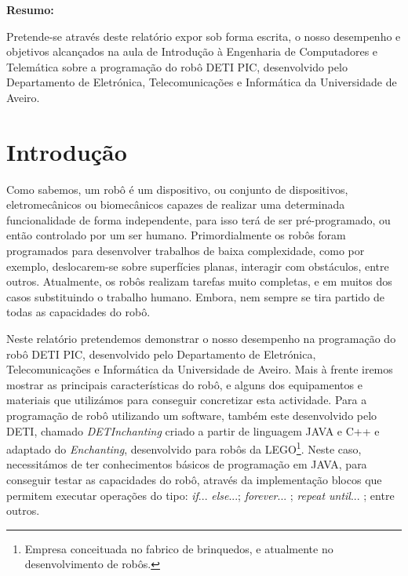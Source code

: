 \documentclass[a4paper, 12pt, onecolumn, oneside]{report}
\begin{document}
\vspace*{\fill}



\textbf{Resumo:}


\begin{flushleft}

 Pretende-se através deste relatório expor sob forma escrita, o nosso desempenho e objetivos alcançados na aula de Introdução à Engenharia de Computadores e Telemática sobre a programação do robô DETI PIC, desenvolvido pelo Departamento de Eletrónica, Telecomunicações e Informática da Universidade de Aveiro.

\end{flushleft}


\vspace*{\fill}

\newpage




\newpage

\renewcommand*\contentsname{Índice}

\tableofcontents 


\newpage
 
\section{Introdução} 


Como sabemos, um robô é um dispositivo, ou conjunto de dispositivos, eletromecânicos ou biomecânicos capazes de realizar uma determinada funcionalidade de forma independente, para isso terá de ser pré-programado, ou então controlado por um ser humano. Primordialmente os robôs foram programados para desenvolver trabalhos de baixa complexidade, como por exemplo, deslocarem-se sobre superfícies planas, interagir com obstáculos, entre outros. Atualmente, os robôs realizam tarefas muito completas, e em muitos dos casos substituindo o trabalho humano. Embora, nem sempre se tira partido de todas as capacidades do robô.

Neste relatório pretendemos demonstrar o nosso desempenho na programação do robô DETI PIC, desenvolvido pelo Departamento de Eletrónica, Telecomunicações e Informática da Universidade de Aveiro. Mais à frente iremos mostrar as principais características do robô, e alguns dos equipamentos e materiais que utilizámos para conseguir concretizar esta actividade. Para a programação de robô utilizando um software, também este desenvolvido pelo DETI, chamado \emph{DETInchanting} criado a partir de linguagem JAVA e C++ e adaptado do \emph{Enchanting}, desenvolvido para robôs da LEGO\footnote{Empresa conceituada no fabrico de brinquedos, e atualmente no desenvolvimento de robôs. }. Neste caso, necessitámos de ter conhecimentos básicos de programação em JAVA, para conseguir testar as capacidades do robô, através da implementação blocos que permitem executar operações do tipo: \emph{if}... \emph{else}...; \emph{forever}... ; \emph{repeat until}... ; entre outros. 
\end{document}
